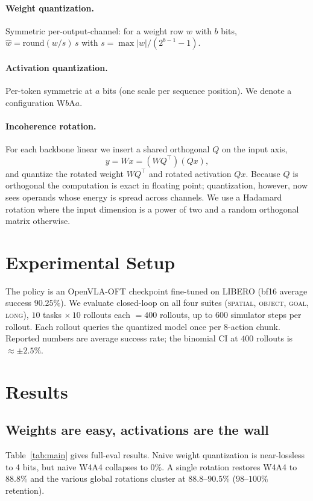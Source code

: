 \documentclass[conference]{IEEEtran}
\begin{document}
\paragraph{Weight quantization.} Symmetric per-output-channel: for a weight row $w$ with
$b$ bits, $\hat w=\mathrm{round}(w/s)\,s$ with $s=\max|w|/(2^{b-1}-1)$.

\paragraph{Activation quantization.} Per-token symmetric at $a$ bits (one scale per sequence
position). We denote a configuration W$b$A$a$.

\paragraph{Incoherence rotation.} For each backbone linear we insert a shared orthogonal
$Q$ on the input axis,
\begin{equation}
y = Wx = (WQ^\top)(Qx),
\end{equation}
and quantize the rotated weight $WQ^\top$ and rotated activation $Qx$. Because $Q$ is
orthogonal the computation is exact in floating point; quantization, however, now sees
operands whose energy is spread across channels. We use a Hadamard rotation where the input
dimension is a power of two and a random orthogonal matrix otherwise.

\section{Experimental Setup}
The policy is an OpenVLA-OFT checkpoint fine-tuned on LIBERO (bf16 average success
$90.25\%$). We evaluate closed-loop on all four suites (\textsc{spatial}, \textsc{object},
\textsc{goal}, \textsc{long}), $10$ tasks $\times\,10$ rollouts each $=400$ rollouts, up to
$600$ simulator steps per rollout. Each rollout queries the quantized model once per
$8$-action chunk. Reported numbers are average success rate; the binomial CI at $400$
rollouts is $\approx\pm2.5\%$.

\section{Results}

\subsection{Weights are easy, activations are the wall}
Table~\ref{tab:main} gives full-eval results. Naive weight quantization is near-lossless to
4 bits, but naive W4A4 collapses to $0\%$. A single rotation restores W4A4 to $88.8\%$ and
the various global rotations cluster at $88.8$--$90.5\%$ ($98$--$100\%$ retention).
\end{document}
